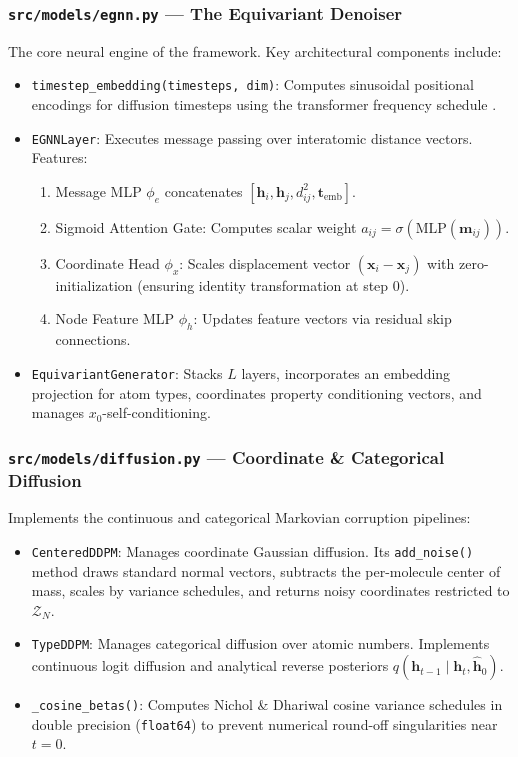\documentclass[12pt, a4paper]{article}
\begin{document}
\subsubsection{\texttt{src/models/egnn.py} --- The Equivariant Denoiser}
The core neural engine of the framework. Key architectural components include:
\begin{itemize}[leftmargin=*]
    \item \texttt{timestep\_embedding(timesteps, dim)}: Computes sinusoidal positional encodings for diffusion timesteps using the transformer frequency schedule \cite{vaswani2017attention}.
    \item \texttt{EGNNLayer}: Executes message passing over interatomic distance vectors. Features:
    \begin{enumerate}[noitemsep]
        \item Message MLP $\phi_e$ concatenates $[\mathbf{h}_i, \mathbf{h}_j, d_{ij}^2, \mathbf{t}_\text{emb}]$.
        \item Sigmoid Attention Gate: Computes scalar weight $a_{ij} = \sigma(\text{MLP}(\mathbf{m}_{ij}))$.
        \item Coordinate Head $\phi_x$: Scales displacement vector $(\mathbf{x}_i - \mathbf{x}_j)$ with zero-initialization (ensuring identity transformation at step 0).
        \item Node Feature MLP $\phi_h$: Updates feature vectors via residual skip connections.
    \end{enumerate}
    \item \texttt{EquivariantGenerator}: Stacks $L$ layers, incorporates an embedding projection for atom types, coordinates property conditioning vectors, and manages $x_0$-self-conditioning.
\end{itemize}

\subsubsection{\texttt{src/models/diffusion.py} --- Coordinate \& Categorical Diffusion}
Implements the continuous and categorical Markovian corruption pipelines:
\begin{itemize}[noitemsep]
    \item \texttt{CenteredDDPM}: Manages coordinate Gaussian diffusion. Its \texttt{add\_noise()} method draws standard normal vectors, subtracts the per-molecule center of mass, scales by variance schedules, and returns noisy coordinates restricted to $\mathcal{Z}_N$.
    \item \texttt{TypeDDPM}: Manages categorical diffusion over atomic numbers. Implements continuous logit diffusion and analytical reverse posteriors $q(\mathbf{h}_{t-1} \mid \mathbf{h}_t, \hat{\mathbf{h}}_0)$.
    \item \texttt{\_cosine\_betas()}: Computes Nichol \& Dhariwal cosine variance schedules in double precision (\texttt{float64}) to prevent numerical round-off singularities near $t=0$.
\end{itemize}
\end{document}

